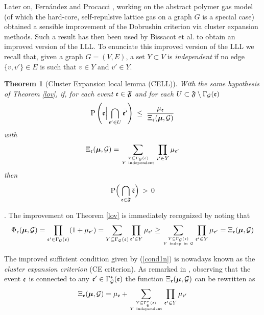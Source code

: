 \documentclass[11pt]{article}
\newtheorem{theo}{Theorem}[section]
\let\m=\mu \let\n=\nu \let\o=\omega    \let\p=\pi \let\ph=\varphi
\let\\=\noindent
\def\ee{\end{equation}}
\def\be{\begin{equation}}
\begin{document}
\\Later on, Fern\'andez and Procacci  \cite{FP}, working on the abstract polymer gas model (of which the
hard-core, self-repulsive lattice gas on
a graph $G$ is a special case)
obtained a sensible improvement of the Dobrushin criterion
via cluster expansion methods. Such a result has then been used by Bissacot et al.  \cite{BFPS}  to obtain an
improved version of the LLL. To enunciate this
improved version of the LLL we recall that, given a graph $G=(V, E)$, a set
$Y\subset V$  is {\it independent} if no edge  $\{v,v'\}\in E$ is such that $v\in Y$ and $v'\in Y$.


\begin{theo}[Cluster Expansion local lemma (CELL)]\label{bis}
With the same hypothesis of Theorem \ref{lov},  if, for each event  ${\mathfrak{e}}\in {\mathfrak{F}}$ and for each ${U}\subset {\mathfrak{F}}\setminus \Gamma_{\cal G}({\mathfrak{e}})$
\begin{equation}
\label{cond1n}
\prob\left(\ev\Big|\bigcap_{\ev'\in U}\bar{\ev'}\right)\;\leq\;  {\mu_\ev \over  \Xi_\ev(\bm \m,\GG)}
\end{equation}
with
\be\label{Xi}
\Xi_\ev(\bm \m,\GG)=\sum_{Y\subseteq\Gamma_\GG(\ev)\atop Y~{\rm independent}} \prod_{\ev'\in Y}\mu_{\ev'}
\ee
then
$$
{{\rm P}}\Big(\bigcap_{{\mathfrak{e}}\in {\mathfrak{F}}}\bar {{\mathfrak{e}}}\Big)\,> \,0
$$
\end{theo}
\\{\bf Remark}.
The improvement on Theorem \ref{lov} is immediately recognized by noting that
$$
\Phi_\ev(\bm \m,\GG)= \prod_{\ev'\in \G_\GG(\ev)} (1+\mu_{\ev'})= \sum\limits_{Y\subseteq  \Gamma_\GG(\ev)}
\prod_{\ev'\in Y}\mu_{\ev'} \ge \sum\limits_{Y\subseteq  \Gamma_\GG(\ev)\atop Y\ {\rm indep\ in}\ \GG}
\prod_{\ev'\in Y}\mu_{\ev'}=\Xi_\ev(\bm \m,\GG)
$$ \def\A{{{\mathcal O}}}

\\The improved  sufficient condition given by (\ref{cond1n}) is nowadays known as the {\it cluster expansion  criterion} (CE criterion).
As remarked in \cite{FP},  observing that
the event ${\mathfrak{e}}$ is connected to any ${\mathfrak{e}}'\in \Gamma^*_{\cal G}({\mathfrak{e}})$
the function  $\Xi_\ev(\bm \m,\GG)$  can be  rewritten as
\be\label{Xi2}
\Xi_\ev(\bm \m,\GG)=\mu_\ev+\sum_{Y\subseteq\Gamma^*_\GG(\ev)\atop Y~{\rm independent}} \prod_{\ev'\in Y}\mu_{\ev'}
\ee
\end{document}
